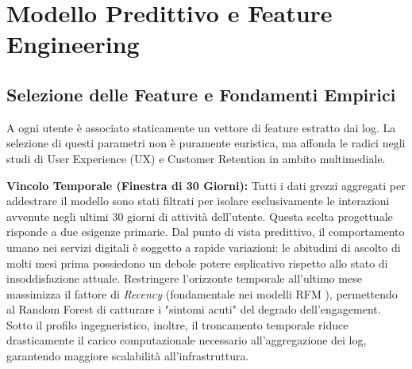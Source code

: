 \documentclass[11pt,a4paper]{article}
\begin{document}
\section{Modello Predittivo e Feature Engineering}
\subsection{Selezione delle Feature e Fondamenti Empirici}
A ogni utente è associato staticamente un vettore di feature estratto dai log. La selezione di questi parametri non è puramente euristica, ma affonda le radici negli studi di User Experience (UX) e Customer Retention in ambito multimediale. 

\textbf{Vincolo Temporale (Finestra di 30 Giorni):} Tutti i dati grezzi aggregati per addestrare il modello sono stati filtrati per isolare esclusivamente le interazioni avvenute negli ultimi 30 giorni di attività dell'utente. Questa scelta progettuale risponde a due esigenze primarie. Dal punto di vista predittivo, il comportamento umano nei servizi digitali è soggetto a rapide variazioni: le abitudini di ascolto di molti mesi prima possiedono un debole potere esplicativo rispetto allo stato di insoddisfazione attuale. Restringere l'orizzonte temporale all'ultimo mese massimizza il fattore di \textit{Recency} (fondamentale nei modelli RFM \cite{burez2009}), permettendo al Random Forest di catturare i "sintomi acuti" del degrado dell'engagement. Sotto il profilo ingegneristico, inoltre, il troncamento temporale riduce drasticamente il carico computazionale necessario all'aggregazione dei log, garantendo maggiore scalabilità all'infrastruttura.
\end{document}
